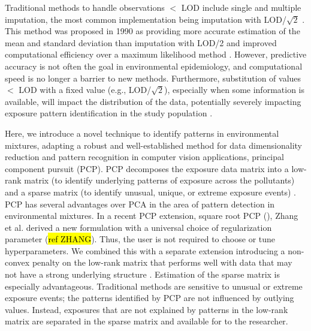 Traditional methods to handle observations $<$ LOD include single and multiple imputation, the most common implementation being imputation with LOD/$\sqrt{2}$ \citep{barr2006survey}. This method was proposed in 1990 as providing more accurate estimation of the mean and standard deviation than imputation with LOD/2 and improved computational efficiency over a maximum likelihood method \citep{hornung1990estimation}. However, predictive accuracy is not often the goal in environmental epidemiology, and computational speed is no longer a barrier to new methods. Furthermore, substitution of values $<$ LOD with a fixed value (e.g., LOD/$\sqrt{2}$), especially when some information is available, will impact the distribution of the data, potentially severely impacting exposure pattern identification in the study population \citep{helsel1990less}.

Here, we introduce a novel technique to identify patterns in environmental mixtures, adapting a robust and well-established method for data dimensionality reduction and pattern recognition in computer vision applications, principal component pursuit (PCP). PCP decomposes the exposure data matrix into a low-rank matrix (to identify underlying patterns of exposure across the pollutants) and a sparse matrix (to identify unusual, unique, or extreme exposure events) \citep{candes2011robust}. PCP has several advantages over PCA in the area of pattern detection in environmental mixtures. In a recent PCP extension, square root PCP (\rootpcpc), Zhang et al. derived a new formulation with a universal choice of regularization parameter (\hl{ref ZHANG}). Thus, the user is not required to choose or tune hyperparameters. We combined this with a separate extension introducing a non-convex penalty on the low-rank matrix that performs well with data that may not have a strong underlying structure \citep{netrapalli2014non, chen2020bridging}. Estimation of the sparse matrix is especially advantageous. Traditional methods are sensitive to unusual or extreme exposure events; the patterns identified by PCP are not influenced by outlying values. Instead, exposures that are not explained by patterns in the low-rank matrix are separated in the sparse matrix and available for to the researcher.

